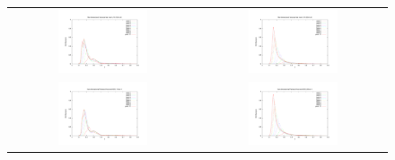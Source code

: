 \begin{figure}[h!]
\begin{tabular}{cc}
      \includegraphics[width=0.5\textwidth]{variance_ad_free_mesh_t3_v10.pdf} & \includegraphics[width=0.5\textwidth]{variance_ad_free_mesh_t3_v20.pdf}\\
\includegraphics[width=0.5\textwidth]{variance_ad_free_mesh_t4_v10.pdf} & \includegraphics[width=0.5\textwidth]{variance_ad_free_mesh_t4_v20.pdf}\\
        \end{tabular}\end{figure}\begin{figure}[h!]
          \begin{tabular}{cc}

\end{tabular}
\end{figure}
